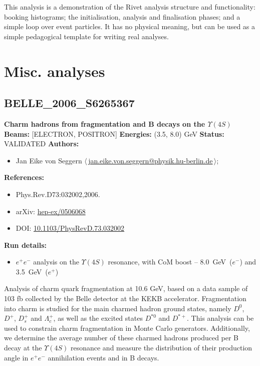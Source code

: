 \noindent This analysis is a demonstration of the Rivet analysis structure and functionality: booking histograms; the initialisation, analysis and finalisation phases; and a simple loop over event particles. It has no physical meaning, but can be used as a simple pedagogical template for writing real analyses.

\clearpage


\section{Misc. analyses}\subsection{BELLE\_2006\_S6265367}
\textbf{Charm hadrons from fragmentation and B decays on the $\Upsilon(4S)$}\newline
\textbf{Beams:} [ELECTRON, POSITRON] \newline
\textbf{Energies:} (3.5, 8.0) GeV \newline
\textbf{Status:} VALIDATED\newline
\textbf{Authors:}
\begin{itemize}
  \item Jan Eike von Seggern $\langle\,$\href{mailto:jan.eike.von.seggern@physik.hu-berlin.de}{jan.eike.von.seggern@physik.hu-berlin.de}$\,\rangle$;
\end{itemize}
\textbf{References:}
\begin{itemize}
  \item Phys.Rev.D73:032002,2006.
  \item arXiv: \href{http://arxiv.org/abs/hep-ex/0506068}{hep-ex/0506068}
  \item DOI: \href{http://dx.doi.org/10.1103/PhysRevD.73.032002}{10.1103/PhysRevD.73.032002}
\end{itemize}
\textbf{Run details:}
\begin{itemize}

  \item $e^+ e^-$ analysis on the $\Upsilon(4S)$ resonance, with CoM boost -- 8.0~GeV~($e^−$) and 3.5~GeV~($e^+$)\end{itemize}

\noindent Analysis of charm quark fragmentation at 10.6 GeV, based on a data sample of 103 fb collected by the Belle detector at the KEKB accelerator. Fragmentation into charm is studied for the main charmed hadron ground states, namely $D^0$, $D^+$, $D^+_s$ and $\Lambda_c^+$, as well as the excited states $D^{*0}$ and $D^{*+}$. This analysis can be used to constrain charm fragmentation in Monte Carlo generators. Additionally, we determine the average number of these charmed hadrons produced per B decay at the $\Upsilon(4S)$ resonance and measure the distribution of their production angle in $e^+ e^-$ annihilation events and in B decays.

